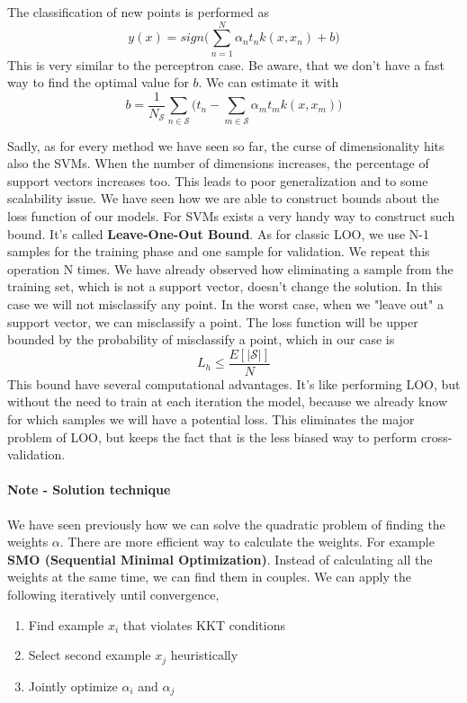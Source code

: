 \documentclass[../main.tex]{subfiles}
\begin{document}
\newline
The classification of new points is performed as
\begin{equation}
    y(x) = sign \bigg( \sum_{n=1}^N \alpha_n t_n k(x, x_n) +b \bigg)
\end{equation}
This is very similar to the perceptron case. Be aware, that we don't have a fast way to find the optimal value for $b$. We can estimate it with
\begin{equation*}
    b = \frac{1}{N_\mathcal{S}} \sum_{n \in \mathcal{S}} \bigg( t_n - \sum_{m \in \mathcal{S}} \alpha_m t_m k(x,x_m) \bigg)
\end{equation*}

Sadly, as for every method we have seen so far, the curse of dimensionality hits also the SVMs. When the number of dimensions increases, the percentage of support vectors increases too. This leads to poor generalization and to some scalability issue.
We have seen how we are able to construct bounds about the loss function of our models. For SVMs exists a very handy way to construct such bound. It's called \textbf{Leave-One-Out Bound}.
As for classic LOO, we use N-1 samples for the training phase and one sample for validation. We repeat this operation N times. We have already observed how eliminating a sample from the training set, which is not a support vector, doesn't change the solution. In this case we will not misclassify any point. In the worst case, when we "leave out" a support vector, we can misclassify a point. The loss function will be upper bounded by the probability of misclassify a point, which in our case is \footnotemark {}
\begin{equation}
    L_h \leq \frac{E[|\mathcal{S}|]}{N}
\end{equation}
This bound have several computational advantages. It's like performing LOO, but without the need to train at each iteration the model, because we already know for which samples we will have a potential loss. This eliminates the major problem of LOO, but keeps the fact that is the less biased way to perform cross-validation.

\paragraph{Note - Solution technique} We have seen previously how we can solve the quadratic problem of finding the weights $\alpha$. There are more efficient way to calculate the weights. For example \textbf{SMO (Sequential Minimal Optimization)}.
Instead of calculating all the weights at the same time, we can find them in couples\footnotemark. We can apply the following iteratively until convergence,
\begin{enumerate}
    \item Find example $x_i$ that violates KKT conditions
    \item Select second example $x_j$ heuristically
    \item Jointly optimize $\alpha_i$ and $\alpha_j$
\end{enumerate}
\end{document}
